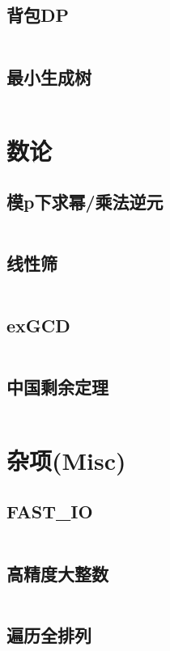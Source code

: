 \documentclass[openany,a4paper]{book}
\begin{document}
\section{背包DP}
\inputminted{cpp}{Algorithm/dp.h}

\section{最小生成树}
\inputminted{cpp}{Algorithm/mst.h}

\chapter{数论}

\section{模p下求幂/乘法逆元}
\inputminted{cpp}{NumberTheory/modPow.h}

\section{线性筛}
\inputminted{cpp}{NumberTheory/linearSieve.h}

\section{exGCD}
\inputminted{cpp}{NumberTheory/exgcd.h}

\section{中国剩余定理}
\inputminted{cpp}{NumberTheory/CRT.h}

\chapter{杂项(Misc)}

\section{FAST\_IO}
\inputminted{cpp}{Misc/fast_io.h}

\section{高精度大整数}
\inputminted{cpp}{Misc/BigInt.h}

\section{遍历全排列}
\inputminted{cpp}{Misc/next_permutation.h}
\end{document}
